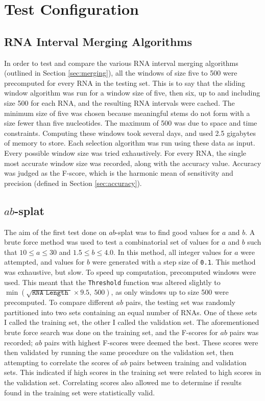 \documentclass{cshonours}
\begin{document}
\section{Test Configuration}

\subsection{RNA Interval Merging Algorithms}
In order to test and compare the various RNA interval merging algorithms (outlined in Section \ref{sec:merging}), all the windows of size five to 500 were precomputed for every RNA in the testing set. This is to say that the sliding window algorithm was run for a window size of five, then six, up to and including size 500 for each RNA, and the resulting RNA intervals were cached. The minimum size of five was chosen because meaningful stems do not form with a size fewer than five nucleotides. The maximum of 500 was due to space and time constraints. Computing these windows took several days, and used 2.5 gigabytes of memory to store. Each selection algorithm was run using these data as input. Every possible window size was tried exhaustively. For every RNA, the single most accurate window size was recorded, along with the accuracy value. Accuracy was judged as the F-score, which is the harmonic mean of sensitivity and precision (defined in Section \ref{sec:accuracy}).


\subsection{$ab$-splat}

The aim of the first test done on $ab$-splat was to find good values for $a$ and $b$. A brute force method was used to test a combinatorial set of values for $a$ and $b$ such that $10 \leq a \leq 30$ and $1.5 \leq b \leq 4.0$. In this method, all integer values for $a$ were attempted, and values for $b$ were generated with a step size of \texttt{0.1}. This method was exhaustive, but slow. To speed up computation, precomputed windows were used. This meant that the \texttt{Threshold} function was altered slightly to $\min(\sqrt{ \texttt {RNA Length } } \times 9.5, \: 500)$, as only windows up to size 500 were precomputed. To compare different $ab$ pairs, the testing set was randomly partitioned into two sets containing an equal number of RNAs. One of these sets I called the training set, the other I called the validation set. The aforementioned brute force search was done on the training set, and the F-scores for $ab$ pairs was recorded; $ab$ pairs with highest F-scores were deemed the best. These scores were then validated by running the same procedure on the validation set, then attempting to correlate the scores of $ab$ pairs between training and validation sets. This  indicated if high scores in the training set were related to high scores in the validation set. Correlating scores also allowed me to determine if results found in the training set were statistically valid.
\end{document}
